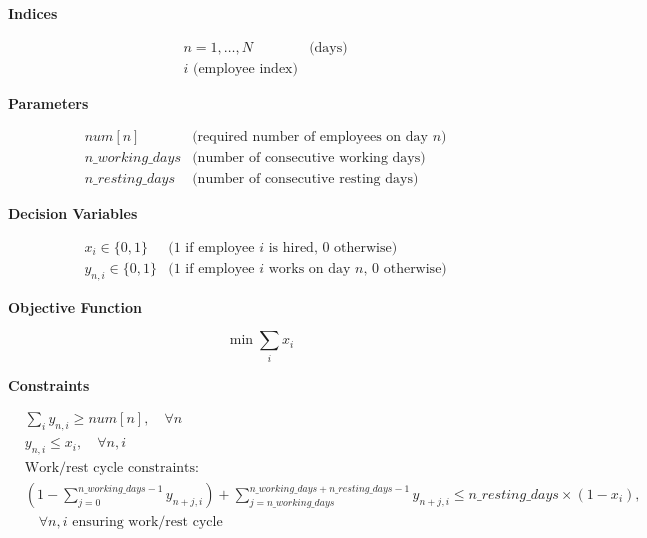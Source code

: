 \documentclass{article}
\begin{document}
\textbf{Indices}

\begin{align*}
& n = 1, \ldots, N & \text{(days)} \\
& i \text{ (employee index)}
\end{align*}

\textbf{Parameters}

\begin{align*}
& num[n] & \text{(required number of employees on day } n) \\
& n\_working\_days & \text{(number of consecutive working days)} \\
& n\_resting\_days & \text{(number of consecutive resting days)}
\end{align*}

\textbf{Decision Variables}

\begin{align*}
& x_i \in \{0,1\} & \text{(1 if employee } i \text{ is hired, 0 otherwise)} \\
& y_{n,i} \in \{0,1\} & \text{(1 if employee } i \text{ works on day } n \text{, 0 otherwise)}
\end{align*}

\textbf{Objective Function}

\[
\min \sum_{i} x_i
\]

\textbf{Constraints}

\begin{align}
& \sum_{i} y_{n,i} \geq num[n], \quad \forall n \\
& y_{n,i} \leq x_i, \quad \forall n, i \\
& \text{Work/rest cycle constraints:} \\
& \left(1 - \sum_{j=0}^{n\_working\_days - 1} y_{n+j,i}\right) + \sum_{j=n\_working\_days}^{n\_working\_days+n\_resting\_days-1} y_{n+j,i} \leq n\_resting\_days \times (1-x_i), \\
& \quad \forall n, i \text{ ensuring work/rest cycle}
\end{align}
\end{document}
